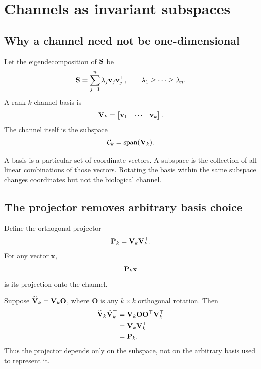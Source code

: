 \chapter{Channels as invariant subspaces}

\section{Why a channel need not be one-dimensional}

Let the eigendecomposition of \(\mathbf{S}\) be
\begin{equation}
\mathbf{S}=\sum_{j=1}^n\lambda_j\mathbf v_j\mathbf v_j^\top,
\qquad
\lambda_1\ge\cdots\ge\lambda_n.
\end{equation}
A rank-\(k\) channel basis is
\begin{equation}
\mathbf{V}_k=
\begin{bmatrix}
\mathbf v_1&\cdots&\mathbf v_k
\end{bmatrix}.
\end{equation}
The channel itself is the subspace
\begin{equation}
\mathcal C_k=\operatorname{span}(\mathbf{V}_k).
\end{equation}

\inwords A basis is a particular set of coordinate vectors. A subspace is the collection of all linear combinations of those vectors. Rotating the basis within the same subspace changes coordinates but not the biological channel.

\section{The projector removes arbitrary basis choice}

Define the orthogonal projector
\begin{equation}
\mathbf{P}_k=\mathbf{V}_k\mathbf{V}_k^\top.
\label{eq:projectorDefinition}
\end{equation}
For any vector \(\mathbf x\),
\begin{equation}
\mathbf{P}_k\mathbf x
\end{equation}
is its projection onto the channel.

Suppose \(\widetilde{\mathbf{V}}_k=\mathbf{V}_k\mathbf O\), where \(\mathbf O\) is any \(k\times k\) orthogonal rotation. Then
\begin{align}
\widetilde{\mathbf{V}}_k\widetilde{\mathbf{V}}_k^\top
&=\mathbf{V}_k\mathbf O\mathbf O^\top\mathbf{V}_k^\top\\
&=\mathbf{V}_k\mathbf{V}_k^\top\\
&=\mathbf{P}_k.
\end{align}
Thus the projector depends only on the subspace, not on the arbitrary basis used to represent it.

